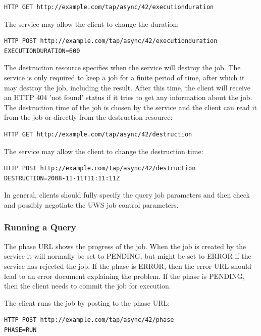 \documentclass[11pt,letter]{ivoa}
\begin{document}
\begin{verbatim}
HTTP GET http://example.com/tap/async/42/executionduration
\end{verbatim}
The service may allow the client to change the duration:
\begin{verbatim}
HTTP POST http://example.com/tap/async/42/executionduration
EXECUTIONDURATION=600
\end{verbatim}

The destruction resource specifies when the service will destroy the job. The 
service is only required to keep a job for a finite period of time, after which 
it may destroy the job, including the result. After this time, the client will 
receive an HTTP 404 'not found' status if it tries to get any information about 
the job. The destruction time of the job is chosen by the service and the client 
can read it from the job or directly from the destruction resource:
\begin{verbatim}
HTTP GET http://example.com/tap/async/42/destruction
\end{verbatim}
The service may allow the client to change the destruction time:
\begin{verbatim}
HTTP POST http://example.com/tap/async/42/destruction
DESTRUCTION=2008-11-11T11:11:11Z
\end{verbatim}

In general, clients should fully specify the query job parameters and then 
check and possibly negotiate the UWS job control parameters.

\subsubsection{Running a Query}
\label{sec:example-RunningQuery}
The phase URL shows the progress of the job. When the job is created by the 
service it will normally be set to PENDING, but might be set to ERROR if the 
service has rejected the job. If the phase is ERROR, then the error URL should 
lead to an error document explaining the problem. If the phase is PENDING, 
then the client needs to commit the job for execution.

The client runs the job by posting to the phase URL:
\begin{verbatim}
HTTP POST http://example.com/tap/async/42/phase
PHASE=RUN
\end{verbatim}
\end{document}
